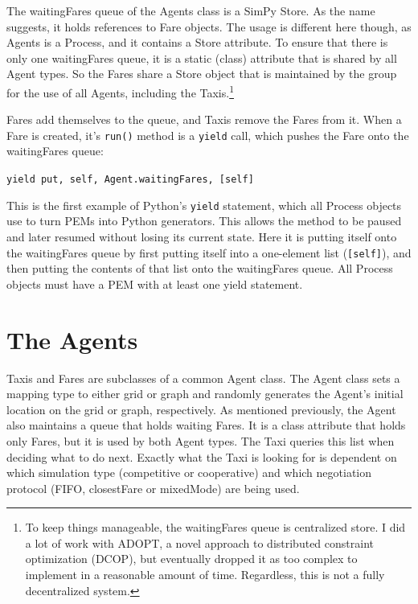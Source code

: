 \documentclass[11pt,letterpaper,onecolumn,twoside,openright,final]{report}
\begin{document}
The waitingFares queue of the Agents class is a SimPy Store.
As the name suggests, it holds references to Fare objects.
The usage is different here though, as Agents is a Process, and it contains a Store attribute.
To ensure that there is only one waitingFares queue, it is a static (class) attribute that is shared by all Agent types.
So the Fares share a Store object that is maintained by the group for the use of all Agents, including the Taxis.\footnote{To keep things manageable, the waitingFares queue is centralized store.
I did a lot of work with ADOPT, a novel approach to distributed constraint optimization (DCOP), but eventually dropped it as too complex to implement in a reasonable amount of time.
Regardless, this is not a fully decentralized system.}

Fares add themselves to the queue, and Taxis remove the Fares from it.
When a Fare is created, it's \texttt{run()} method is a \texttt{yield} call, which pushes the Fare onto the waitingFares queue:

\texttt{yield put, self, Agent.waitingFares, [self]}

This is the first example of Python's \texttt{yield} statement, which all Process objects use to turn PEMs into Python generators.
This allows the method to be paused and later resumed without losing its current state.
Here it is putting itself onto the waitingFares queue by first putting itself into a one-element list (\texttt{[self]}), and then putting the contents of that list onto the waitingFares queue.
All Process objects must have a PEM with at least one yield statement.

\section{The Agents}
Taxis and Fares are subclasses of a common Agent class.
The Agent class sets a mapping type to either grid or graph and randomly generates the Agent's initial location on the grid or graph, respectively.
As mentioned previously, the Agent also maintains a queue that holds waiting Fares.
It is a class attribute that holds only Fares, but it is used by both Agent types.
The Taxi queries this list when deciding what to do next.
Exactly what the Taxi is looking for is dependent on which simulation type (competitive or cooperative) and which negotiation protocol (FIFO, closestFare or mixedMode) are being used.
\end{document}
